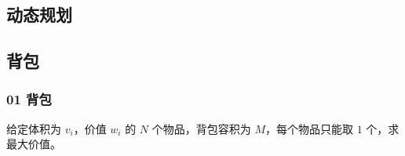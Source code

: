 \documentclass{probook}
\begin{document}
\begin{multicols}{2}


% 



% 



% 



% 







\chapter{动态规划}

\section{背包}

\subsection{01 背包}

给定体积为 $v_i$，价值 $w_i$ 的 $N$ 个物品，背包容积为 $M$，每个物品只能取 $1$ 个，求最大价值。


\end{multicols}
\end{document}
